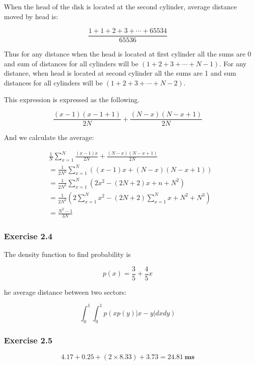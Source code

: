 \documentclass[../../main.tex]{subfiles}
\begin{document}
When the head of the disk is located at the second cylinder, average
distance moved by head is:

$$
\frac{1 + 1 + 2 + 3  + \cdots + 65534}{65536}
$$

Thus for any distance when the head is located at first cylinder all
the sums are 0 and sum of distances for all cylinders will be
$(1 + 2 + 3 + \cdots + N - 1)$. For any distance, when head is
located at second cylinder all the sums are 1 and sum distances
for all cylinders will be $(1 + 2 + 3 + \cdots + N - 2)$.

This expression is expressed as the following.

$$
\frac{(x - 1)(x - 1 + 1)}{2N} + \frac{(N - x)(N - x + 1)}{2N}
$$

And we calculate the average:

\begin{align*}
  &\frac{1}{N}\sum_{x = 1}^{N}\frac{(x - 1)x}{2N} + \frac{(N - x)(N - x + 1)}{2N} \\
  &=\frac{1}{2N^2}\sum_{x = 1}^{N}((x-1)x + (N - x)(N - x + 1)) \\
  &=\frac{1}{2N^2}\sum_{x = 1}^{N}(2x^2 - (2N+2)x + n + N^2) \\
  &=\frac{1}{2N^2}(2\sum_{x = 1}^{N}x^2 - (2N+2)\sum_{x = 1}^{N}x + N^2 + N^3) \\
  &=\frac{N^2 - 1}{3N}
\end{align*}

\subsubsection*{Exercise 2.4}

The density function to find probability is

$$
p(x) = \frac{3}{5} + \frac{4}{5}x
$$

he average distance between two sectors:

$$
\int_0^1 \int_0^1 p(xp(y)|x-y|dxdy)
$$

\subsubsection*{Exercise 2.5}

$$
4.17 + 0.25 + (2 \times 8.33) + 3.73= 24.81 \ \mathbf{ms}
$$
\end{document}
